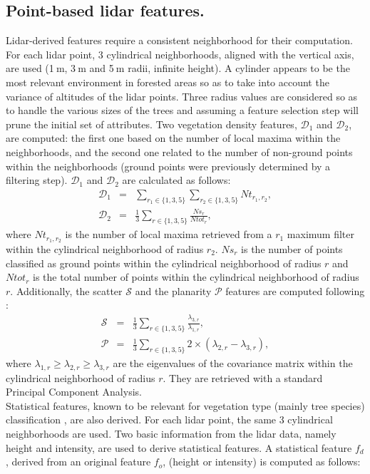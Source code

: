 \subsection{Point-based lidar features.}
Lidar-derived features require a consistent neighborhood for their computation. For each lidar point, 3 cylindrical neighborhoods, aligned with the vertical axis, are used (1$\:$m, 3$\:$m and 5$\:$m radii, infinite height). A cylinder appears to be the most relevant environment in forested areas so as to take into account the variance of altitudes of the lidar points. Three radius values are considered so as to handle the various sizes of the trees and assuming a feature selection step will prune the initial set of attributes. Two vegetation density features, $\mathcal{D}_{1}$ and $\mathcal{D}_{2}$, are computed: the first one based on the number of local maxima within the neighborhoods, and the second one related to the number of non-ground points within the neighborhoods (ground points were previously determined by a filtering step). $\mathcal{D}_{1}$ and $\mathcal{D}_{2}$ are calculated as follows:
\begin{eqnarray}
\mathcal{D}_{1} & = & \sum_{r_{1} \in \{1,3,5\}}\sum_{r_{2} \in \{1,3,5\}}Nt_{r_{1},r_{2}}, \\
\mathcal{D}_{2} & = & \frac{1}{3}\sum_{r \in \{1,3,5\}}\frac{Ns_{r}}{Ntot_{r}},
\end{eqnarray}
where $Nt_{r_{1},r_{2}}$ is the number of local maxima retrieved from a $r_{1}$ maximum filter within the cylindrical neighborhood of radius $r_{2}$. $Ns_{r}$ is the number of points classified as ground points within the cylindrical neighborhood of radius $r$ and $Ntot_{r}$ is the total number of points within the cylindrical neighborhood of radius $r$. Additionally, the scatter $\mathcal{S}$ and the planarity $\mathcal{P}$ features are computed following \citet{Weinmann2015286}:
\begin{eqnarray}
\mathcal{S} & = & \frac{1}{3}\sum_{r \in \{1,3,5\}}\frac{\lambda_{3,r}}{\lambda_{1,r}}, \\
\mathcal{P} & = & \frac{1}{3}\sum_{r \in \{1,3,5\}}2\times(\lambda_{2,r}-\lambda_{3,r}),
\end{eqnarray}
where $\lambda_{1,r}\geq\lambda_{2,r}\geq\lambda_{3,r}$ are the eigenvalues of the covariance matrix within the cylindrical neighborhood of radius $r$. They are retrieved with a standard Principal Component Analysis. \\
Statistical features, known to be relevant for vegetation type (mainly tree species) classification \citep{dalponte2014tree,torabzadeh2015optimal}, are also derived. For each lidar point, the same 3 cylindrical neighborhoods are used. Two basic information from the lidar data, namely height and intensity, are used to derive statistical features. A statistical feature $f_{d}$, derived from an original feature $f_{o}$, (height or intensity) is computed as follows: \\
